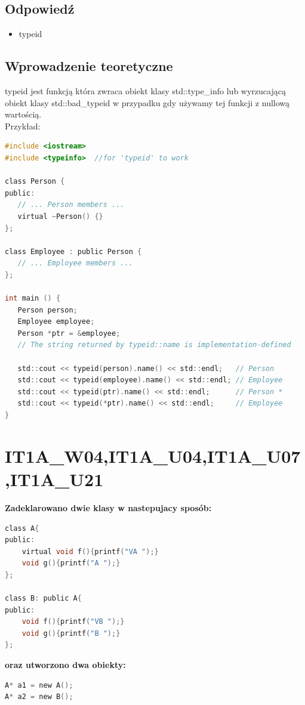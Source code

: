 \subsection{Odpowiedź}
\begin{itemize}
\item typeid
\end{itemize}

\subsection{Wprowadzenie teoretyczne}
typeid jest funkcją która zwraca obiekt klasy std::type\_info lub wyrzucającą obiekt klasy std::bad\_typeid w przypadku gdy używamy tej funkcji z nullową wartością.\\
Przykład:
\begin{lstlisting}[language=c]
#include <iostream>
#include <typeinfo>  //for 'typeid' to work

class Person {
public:
   // ... Person members ...
   virtual ~Person() {}
};

class Employee : public Person {
   // ... Employee members ...
};

int main () {
   Person person;
   Employee employee;
   Person *ptr = &employee;
   // The string returned by typeid::name is implementation-defined
   
   std::cout << typeid(person).name() << std::endl;   // Person
   std::cout << typeid(employee).name() << std::endl; // Employee
   std::cout << typeid(ptr).name() << std::endl;      // Person * 
   std::cout << typeid(*ptr).name() << std::endl;     // Employee
}
\end{lstlisting}


\section{IT1A\_W04,IT1A\_U04,IT1A\_U07,IT1A\_U21}
\textbf{Zadeklarowano dwie klasy w nastepujacy sposób:}
\begin{lstlisting}[language=c]
class A{
public:
	virtual void f(){printf("VA ");}
	void g(){printf("A ");}
};

class B: public A{
public:
	void f(){printf("VB ");}
	void g(){printf("B ");}
};
\end{lstlisting}
\textbf{oraz utworzono dwa obiekty:}
\begin{lstlisting}[language=c]
A* a1 = new A();
A* a2 = new B();
\end{lstlisting}

